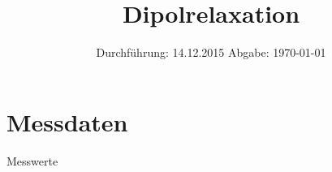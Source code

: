 

\subject{V48}
\title{Dipolrelaxation}
\date{
  Durchführung: 14.12.2015
  \hspace{3em}
  Abgabe: \today
}



\maketitle
\thispagestyle{empty}
\tableofcontents
\newpage



% 


\printbibliography

\appendix

\newpage
\section{Messdaten}
\begin{table}
  \caption{Messwerte}\label{tab:data}
  \hfill%
  \hfill%
  \hfill%
  \hfill%
\end{table}


